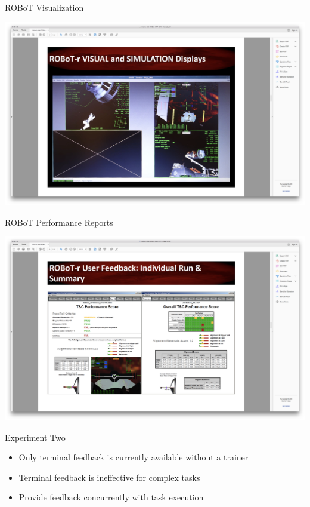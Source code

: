 \documentclass[10pt]{beamer}
\begin{document}
\begin{frame}[fragile]{ROBoT Visualization}
  \begin{center}
    \includegraphics[trim={13cm 5cm 22cm 15.5cm},clip,width=\linewidth]{../img/Screen_Shot_2018-07-26_at_1.43.02_PM.png}
  \end{center}
\end{frame}

\begin{frame}[fragile]{ROBoT Performance Reports}
  \begin{center}
    \includegraphics[trim={13cm 5cm 22cm 15.5cm},clip,width=\linewidth]{../img/Screen_Shot_2018-07-26_at_1.43.07_PM.png}
  \end{center}
\end{frame}

\begin{frame}[fragile]{Experiment Two}
  \begin{itemize}
    \setlength\itemsep{1em}
    \item Only terminal feedback is currently available without a trainer
    \item Terminal feedback is ineffective for complex tasks
    \item Provide feedback concurrently with task execution
  \end{itemize}
\end{frame}
\end{document}
